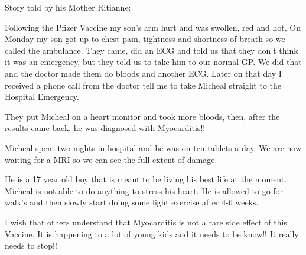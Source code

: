 Story told by his Mother Ritianne:

Following the Pfizer Vaccine my son’s arm hurt and was swollen, red and hot, On
Monday my son got up to chest pain, tightness and shortness of breath so we
called the ambulance. They came, did an ECG and told us that they don’t think it
was an emergency, but they told us to take him to our normal GP. We did that and
the doctor made them do bloods and another ECG. Later on that day I received a
phone call from the doctor tell me to take Micheal straight to the Hospital
Emergency.

They put Micheal on a heart monitor and took more bloods, then, after the
results came back, he was diagnosed with Myocarditis!!

Micheal spent two nights in hospital and he was on ten tablets a day. We are now
waiting for a MRI so we can see the full extent of damage.

He is a 17 year old boy that is meant to be living his best life at the
moment. Micheal is not able to do anything to stress his heart. He is allowed to
go for walk’s and then slowly start doing some light exercise after 4-6 weeks.

I wish that others understand that Myocarditis is not a rare side effect of this
Vaccine. It is happening to a lot of young kids and it needs to be know!! It
really needs to stop!!
